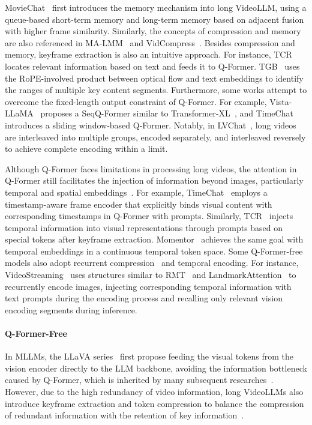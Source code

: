 MovieChat~\citep{song2024moviechat} first introduces the memory mechanism into long VideoLLM, using a queue-based short-term memory and long-term memory based on adjacent fusion with higher frame similarity. Similarly, the concepts of compression and memory are also referenced in MA-LMM~\citep{he2024ma} and VidCompress~\citep{lan2024vidcompress}. Besides compression and memory, keyframe extraction is also an intuitive approach. For instance, TCR~\citep{korbar2025text} locates relevant information based on text and feeds it to Q-Former. TGB~\citep{wang2024efficient} uses the RoPE-involved product between optical flow and text embeddings to identify the ranges of multiple key content segments. Furthermore, some works attempt to overcome the fixed-length output constraint of Q-Former. For example, Vista-LLaMA~\citep{ma2023vista} proposes a SeqQ-Former similar to Transformer-XL~\citep{dai2019transformer}, and TimeChat~\citep{ren2024timechat} introduces a sliding window-based Q-Former. Notably, in LVChat~\citep{wang2024lvchat}, long videos are interleaved into multiple groups, encoded separately, and interleaved reversely to achieve complete encoding within a limit.

Although Q-Former faces limitations in processing long videos, the attention in Q-Former still facilitates the injection of information beyond images, particularly temporal and spatial embeddings~\citep{ren2024timechat,qianmomentor}. For example, TimeChat~\citep{ren2024timechat} employs a timestamp-aware frame encoder that explicitly binds visual content with corresponding timestamps in Q-Former with prompts. Similarly, TCR~\citep{korbar2025text} injects temporal information into visual representations through prompts based on special tokens after keyframe extraction. Momentor~\citep{qianmomentor} achieves the same goal with temporal embeddings in a continuous temporal token space. Some Q-Former-free models also adopt recurrent compression~\citep{wang2024videollamb} and temporal encoding. For instance, VideoStreaming~\citep{qian2024streaming} uses structures similar to RMT~\citep{bulatov2022recurrent} and LandmarkAttention~\citep{mohtashami2023random} to recurrently encode images, injecting corresponding temporal information with text prompts during the encoding process and recalling only relevant vision encoding segments during inference.

\paragraph{Q-Former-Free} In MLLMs, the LLaVA series~\citep{liu2024llava,liu2024llava1_5,liu2024llavanext,zhang2024llavanextvideo} first propose feeding the visual tokens from the vision encoder directly to the LLM backbone, avoiding the information bottleneck caused by Q-Former, which is inherited by many subsequent researches~\citep{li2024llava,wang2024qwen2,zhang2024internlm}. However, due to the high redundancy of video information, long VideoLLMs also introduce keyframe extraction and token compression to balance the compression of redundant information with the retention of key information~\citep{zou2024seconds,yu2024frame,cheng2024videollama}.

